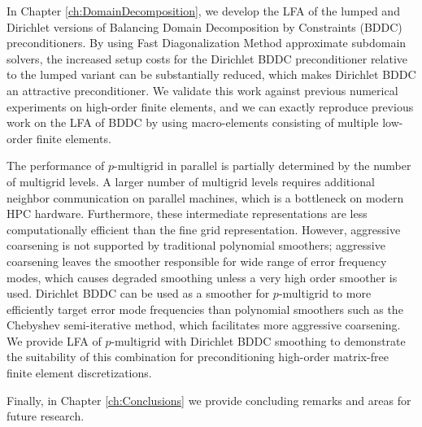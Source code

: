 In Chapter \ref{ch:DomainDecomposition}, we develop the LFA of the lumped and Dirichlet versions of Balancing Domain Decomposition by Constraints (BDDC) preconditioners.
By using Fast Diagonalization Method approximate subdomain solvers, the increased setup costs for the Dirichlet BDDC preconditioner relative to the lumped variant can be substantially reduced, which makes Dirichlet BDDC an attractive preconditioner.
We validate this work against previous numerical experiments on high-order finite elements, and we can exactly reproduce previous work \cite{brown2019local} on the LFA of BDDC by using macro-elements consisting of multiple low-order finite elements.

The performance of $p$-multigrid in parallel is partially determined by the number of multigrid levels.
A larger number of multigrid levels requires additional neighbor communication on parallel machines, which is a bottleneck on modern HPC hardware.
Furthermore, these intermediate representations are less computationally efficient than the fine grid representation.
However, aggressive coarsening is not supported by traditional polynomial smoothers; aggressive coarsening leaves the smoother responsible for wide range of error frequency modes, which causes degraded smoothing unless a very high order smoother is used.
Dirichlet BDDC can be used as a smoother for $p$-multigrid to more efficiently target error mode frequencies than polynomial smoothers such as the Chebyshev semi-iterative method, which facilitates more aggressive coarsening.
We provide LFA of $p$-multigrid with Dirichlet BDDC smoothing to demonstrate the suitability of this combination for preconditioning high-order matrix-free finite element discretizations.

Finally, in Chapter \ref{ch:Conclusions} we provide concluding remarks and areas for future research.